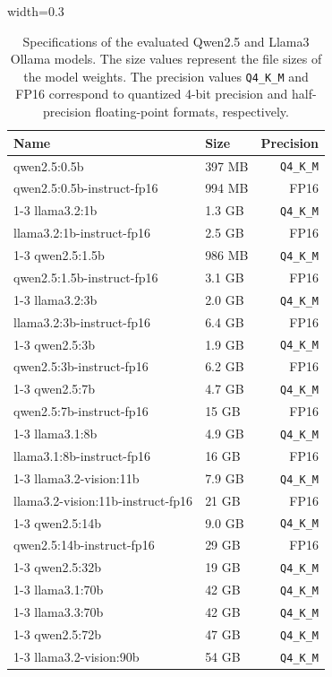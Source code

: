 \documentclass[conference]{IEEEtran}
\begin{document}
\begin{table}[htbp]
\centering
\begin{adjustbox}{width=0.3\textwidth}
\begin{tabular}{llr}
\toprule
\textbf{Name} & \textbf{Size} & \textbf{Precision} \\ 
\midrule
qwen2.5:0.5b & 397 MB & \texttt{Q4\_K\_M} \\ 
qwen2.5:0.5b-instruct-fp16 & 994 MB & FP16 \\ 
\cmidrule(lr){1-3}
llama3.2:1b & 1.3 GB & \texttt{Q4\_K\_M} \\ 
llama3.2:1b-instruct-fp16 & 2.5 GB & FP16 \\ 
\cmidrule(lr){1-3}
qwen2.5:1.5b & 986 MB & \texttt{Q4\_K\_M} \\ 
qwen2.5:1.5b-instruct-fp16 & 3.1 GB & FP16 \\ 
\cmidrule(lr){1-3}
llama3.2:3b & 2.0 GB & \texttt{Q4\_K\_M} \\ 
llama3.2:3b-instruct-fp16 & 6.4 GB & FP16 \\ 
\cmidrule(lr){1-3}
qwen2.5:3b & 1.9 GB & \texttt{Q4\_K\_M} \\ 
qwen2.5:3b-instruct-fp16 & 6.2 GB & FP16 \\ 
\cmidrule(lr){1-3}
qwen2.5:7b & 4.7 GB & \texttt{Q4\_K\_M} \\ 
qwen2.5:7b-instruct-fp16 & 15 GB & FP16 \\ 
\cmidrule(lr){1-3}
llama3.1:8b & 4.9 GB & \texttt{Q4\_K\_M} \\ 
llama3.1:8b-instruct-fp16 & 16 GB & FP16 \\ 
\cmidrule(lr){1-3}
llama3.2-vision:11b & 7.9 GB & \texttt{Q4\_K\_M} \\ 
llama3.2-vision:11b-instruct-fp16 & 21 GB & FP16 \\ 
\cmidrule(lr){1-3}
qwen2.5:14b & 9.0 GB & \texttt{Q4\_K\_M} \\ 
qwen2.5:14b-instruct-fp16 & 29 GB & FP16 \\ 
\cmidrule(lr){1-3}
qwen2.5:32b & 19 GB & \texttt{Q4\_K\_M} \\ 
\cmidrule(lr){1-3}
llama3.1:70b & 42 GB & \texttt{Q4\_K\_M} \\ 
\cmidrule(lr){1-3}
llama3.3:70b & 42 GB & \texttt{Q4\_K\_M} \\ 
\cmidrule(lr){1-3}
qwen2.5:72b & 47 GB & \texttt{Q4\_K\_M} \\ 
\cmidrule(lr){1-3}
llama3.2-vision:90b & 54 GB & \texttt{Q4\_K\_M} \\ 
\bottomrule
\end{tabular}
\end{adjustbox}
\caption{Specifications of the evaluated Qwen2.5 and Llama3 Ollama models. The size values represent the file sizes of the model weights. The precision values \texttt{Q4\_K\_M} and FP16 correspond to quantized 4-bit precision and half-precision floating-point formats, respectively.}
\label{tab:model_specs}
\end{table}
\end{document}
